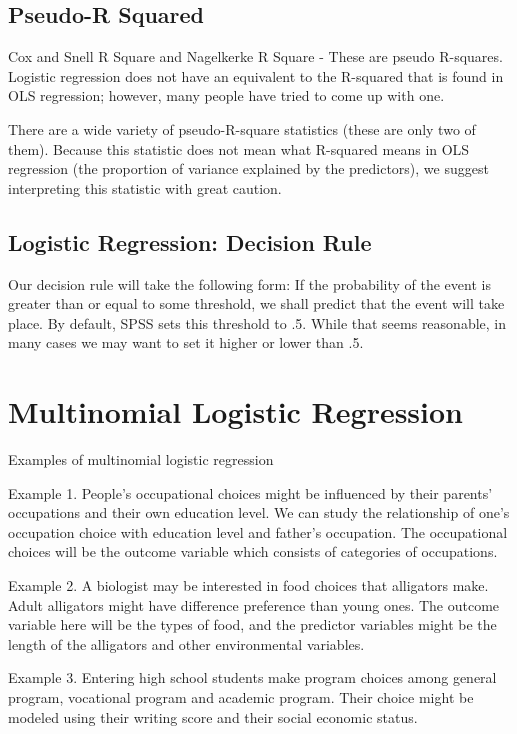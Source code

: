 \documentclass[a4paper,12pt]{article}
\begin{document}
\subsection{Pseudo-R Squared}
Cox  and Snell R Square and Nagelkerke R Square - These are pseudo R-squares.  Logistic regression does not have an equivalent to the R-squared that is found in OLS regression; however, many people have tried to come up with one.  

There are a wide variety of pseudo-R-square statistics (these are only two of them).  Because this statistic does not mean what R-squared means in OLS regression (the proportion of variance explained by the predictors), we suggest interpreting this statistic with great caution.
\newpage
\subsection{Logistic Regression: Decision Rule}
Our decision rule will take the following form: If the probability of the event is greater than or equal to some threshold, we shall predict that the event will take place. By default, SPSS sets this threshold to .5. While that seems reasonable, in many cases we may want to set it higher or lower than .5.

\section{Multinomial Logistic Regression}
Examples of multinomial logistic regression

Example 1. People's occupational choices might be influenced by their parents' occupations and their own education level. We can study the relationship of one's occupation choice with education level and father's occupation.  The occupational choices will be the outcome variable which consists of categories of occupations.

Example 2. A biologist may be interested in food choices that alligators make. Adult alligators might have difference preference than young ones. The outcome variable here will be the types of food, and the predictor variables might be the length of the alligators and other environmental variables.

Example 3. Entering high school students make program choices among general program, vocational program and academic program. Their choice might be modeled using their writing score and their social economic status.
\end{document}
